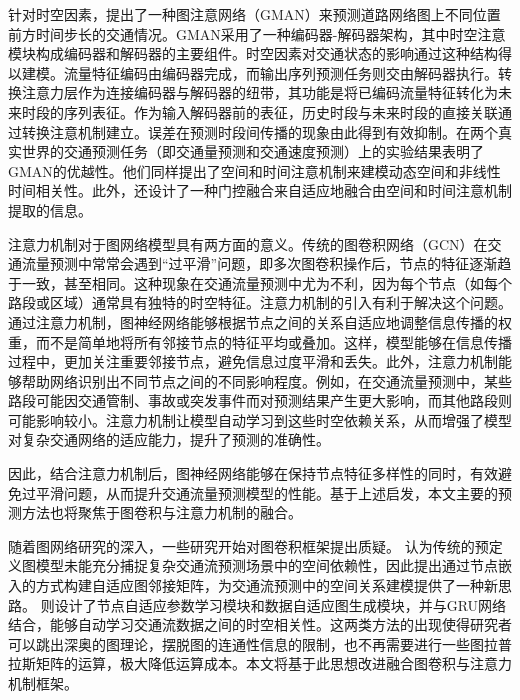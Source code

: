 \textcite{2020_Zheng_GMAN_A_graph_multi_attention_network_for_traffic_prediction} 针对时空因素，提出了一种图注意网络（GMAN）来预测道路网络图上不同位置前方时间步长的交通情况。GMAN采用了一种编码器-解码器架构，其中时空注意模块构成编码器和解码器的主要组件。时空因素对交通状态的影响通过这种结构得以建模。流量特征编码由编码器完成，而输出序列预测任务则交由解码器执行。转换注意力层作为连接编码器与解码器的纽带，其功能是将已编码流量特征转化为未来时段的序列表征。作为输入解码器前的表征，历史时段与未来时段的直接关联通过转换注意机制建立。误差在预测时段间传播的现象由此得到有效抑制。在两个真实世界的交通预测任务（即交通量预测和交通速度预测）上的实验结果表明了GMAN的优越性。他们同样提出了空间和时间注意机制来建模动态空间和非线性时间相关性。此外，还设计了一种门控融合来自适应地融合由空间和时间注意机制提取的信息。

注意力机制对于图网络模型具有两方面的意义。传统的图卷积网络（GCN）在交通流量预测中常常会遇到“过平滑”问题，即多次图卷积操作后，节点的特征逐渐趋于一致，甚至相同。这种现象在交通流量预测中尤为不利，因为每个节点（如每个路段或区域）通常具有独特的时空特征。注意力机制的引入有利于解决这个问题。通过注意力机制，图神经网络能够根据节点之间的关系自适应地调整信息传播的权重，而不是简单地将所有邻接节点的特征平均或叠加。这样，模型能够在信息传播过程中，更加关注重要邻接节点，避免信息过度平滑和丢失。此外，注意力机制能够帮助网络识别出不同节点之间的不同影响程度。例如，在交通流量预测中，某些路段可能因交通管制、事故或突发事件而对预测结果产生更大影响，而其他路段则可能影响较小。注意力机制让模型自动学习到这些时空依赖关系，从而增强了模型对复杂交通网络的适应能力，提升了预测的准确性。

因此，结合注意力机制后，图神经网络能够在保持节点特征多样性的同时，有效避免过平滑问题，从而提升交通流量预测模型的性能。基于上述启发，本文主要的预测方法也将聚焦于图卷积与注意力机制的融合。

随着图网络研究的深入，一些研究开始对图卷积框架提出质疑。\textcite{2019_Wu_Graph_wavenet_for_deep_spatial_temporal_graph_modeling} 认为传统的预定义图模型未能充分捕捉复杂交通流预测场景中的空间依赖性，因此提出通过节点嵌入的方式构建自适应图邻接矩阵，为交通流预测中的空间关系建模提供了一种新思路。\textcite{2020_Bai_Adaptive_graph_convolutional_recurrent_network_for_traffic_forecasting} 则设计了节点自适应参数学习模块和数据自适应图生成模块，并与GRU网络结合，能够自动学习交通流数据之间的时空相关性。这两类方法的出现使得研究者可以跳出深奥的图理论，摆脱图的连通性信息的限制，也不再需要进行一些图拉普拉斯矩阵的运算，极大降低运算成本。本文将基于此思想改进融合图卷积与注意力机制框架。



